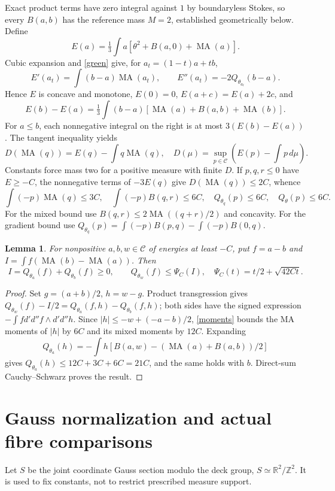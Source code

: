 \documentclass[11pt]{article}
\newcommand{\DD}{d'd''}
\newcommand{\MA}{\operatorname{MA}}
\newcommand{\C}{\mathcal C}
\newcommand{\R}{\mathbb R}
\newtheorem{lemma}[theorem]{Lemma}
\theoremstyle{remark}\newtheorem{remark}[theorem]{Remark}
\begin{document}
Exact product terms have zero integral against $1$ by boundaryless
Stokes, so every $B(a,b)$ has the reference mass $M=2$, established
geometrically below. Define
\[
 E(a)=\tfrac13\int a[\theta^2+B(a,0)+\MA(a)].
\]
Cubic expansion and \eqref{green} give, for $a_t=(1-t)a+tb$,
\begin{equation}\label{variations}
 E'(a_t)=\int(b-a)\MA(a_t),\qquad E''(a_t)=-2Q_{\theta_{a_t}}(b-a).
\end{equation}
Hence $E$ is concave and monotone, $E(0)=0$, $E(a+c)=E(a)+2c$,
and
\begin{equation}\label{cocycle}
 E(b)-E(a)=\tfrac13\int(b-a)[\MA(a)+B(a,b)+\MA(b)].
\end{equation}
For $a\le b$, each nonnegative integral on the right is at most
$3(E(b)-E(a))$. The tangent inequality yields
\[
 D(\MA(q))=E(q)-\int q\MA(q),\quad
 D(\mu)=\sup_{p\in\C}\left(E(p)-\int p\,d\mu\right).
\]
Constants force mass two for a positive measure with finite $D$.
If $p,q,r\le0$ have $E\ge-C$, the nonnegative terms of $-3E(q)$
give $D(\MA(q))\le2C$, whence
\begin{equation}\label{moments}
 \int(-p)\MA(q)\le3C,\quad \int(-p)B(q,r)\le6C,
 \quad Q_{\theta_q}(p)\le6C,\quad Q_\theta(p)\le6C.
\end{equation}
For the mixed bound use $B(q,r)\le2\MA((q+r)/2)$ and concavity.
For the gradient bound use
$Q_{\theta_q}(p)=\int(-p)B(p,q)-\int(-p)B(0,q)$.

\begin{lemma}\label{alltest}
For nonpositive $a,b,w\in\C$ of energies at least $-C$, put
$f=a-b$ and $I=\int f(\MA(b)-\MA(a))$. Then
\[
 I=Q_{\theta_a}(f)+Q_{\theta_b}(f)\ge0,\qquad
 Q_{\theta_w}(f)\le\Psi_C(I),\quad
 \Psi_C(t)=t/2+\sqrt{42Ct}.
\]
\end{lemma}
\begin{proof}
Set $g=(a+b)/2$, $h=w-g$. Product transgression gives
$Q_{\theta_w}(f)-I/2=Q_{\theta_a}(f,h)-Q_{\theta_b}(f,h)$;
both sides have the signed expression $-\int f\DD f\wedge\DD h$.
Since $|h|\le-w+(-a-b)/2$, \eqref{moments} bounds the MA moments
of $|h|$ by $6C$ and its mixed moments by $12C$.
Expanding
\[
 Q_{\theta_a}(h)=-\int h[B(a,w)-(\MA(a)+B(a,b))/2]
\]
gives $Q_{\theta_a}(h)\le12C+3C+6C=21C$, and the same holds
with $b$. Direct-sum Cauchy--Schwarz proves the result.
\end{proof}

\section{Gauss normalization and actual fibre comparisons}
Let $S$ be the joint coordinate Gauss section modulo the deck group,
$S\simeq\R^2/\mathbb Z^2$. It is used to fix constants, not to
restrict prescribed measure support.
\end{document}
